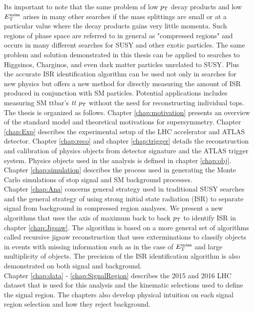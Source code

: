 \indent Its important to note that the same problem of low $p_{\mathrm{T}}$ decay products and low $E_{\mathrm{T}}^{\mathrm{miss}}$ arises in many other searches if the mass splittings are small or at a particular value where the decay products gains very little momenta. Such regions of phase space are referred to in general as "compressed regions" and occurs in many different searches for SUSY and other exotic particles.  The same problem and solution demonstrated in this thesis can be applied to searches to Higgsinos, Charginos, and even dark matter particles unrelated to SUSY.  Plus the accurate ISR identification algorithm can be used not only in searches for new physics but offers a new method for directly measuring the amount of ISR produced in conjunction with SM particles. Potential applications includes measuring SM ttbar's $tt~p_{\mathrm{T}}$ without the need for reconstructing individual tops. \\

\indent The thesis is organized as follows.  Chapter \ref{chap:motivation} presents an overview of the standard model and theoretical motivations for supersymmetry.  Chapter \ref{chap:Exp} describes the experimental setup of the LHC accelerator and ATLAS detector.   Chapter \ref{chap:reco} and chapter \ref{chap:trigger} details the reconstruction and calibration of physics objects from detector signature and the ATLAS trigger system.  Physics objects used in the analysis is defined in chapter \ref{chap:obj}.  Chapter \ref{chap:simulation} describes the process used in generating the Monte Carlo simulations of stop signal and SM background processes.  \\ 

\indent Chapter \ref{chap:Ana} concerns general strategy used in traditional SUSY searches and the general strategy of using strong initial state radiation (ISR) to separate signal from background in compressed region analyses.  We present a new algorithms that uses the axis of maximum back to back $p_{\mathrm{T}}$ to identify ISR in chapter \ref{chap:Jigsaw}.  The algorithm is based on a more general set of algorithms called recursive jigsaw reconstruction that uses exterminations to classify objects in events with missing information such as in the case of $E_{\mathrm{T}}^{\mathrm{miss}}$ and large multiplicity of objects.  The precision of the ISR identification algorithm is also demonstrated on both signal and background. \\

\indent Chapter \ref{chap:data} - \ref{chap:SignalRegion} describes the 2015 and 2016 LHC dataset that is used for this analysis and the kinematic selections used to define the signal region.  The chapters also develop physical intuition on each signal region selection and how they reject background.  \\

